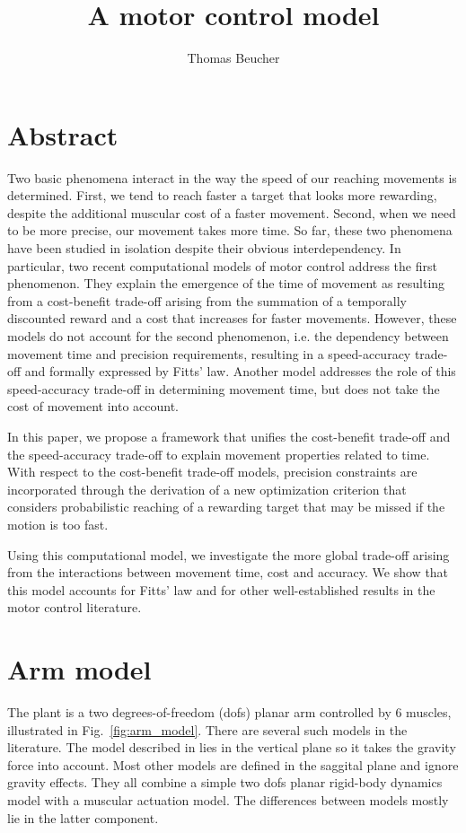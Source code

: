 \documentclass[pdftex,a4paper,11pt]{article}
\begin{document}
\title{A motor control model}
\author{Thomas Beucher}
\maketitle

\section*{Abstract}
Two basic phenomena interact in the way the speed of our reaching movements is determined.
First, we tend to reach faster a target that looks more rewarding, despite the additional muscular cost
of a faster movement.
Second, when we need to be more precise, our movement takes more time.
So far, these two phenomena have been studied in isolation despite their obvious interdependency.
In particular, two recent computational models of motor control address the first phenomenon. They explain the emergence of the time of movement as resulting from a cost-benefit trade-off arising from the summation of a temporally discounted reward and a cost that increases for faster movements.
However, these models do not account for the second phenomenon, i.e. the dependency between movement time and precision requirements, resulting in a speed-accuracy trade-off and formally expressed by Fitts' law. Another model addresses the role of this speed-accuracy trade-off in determining movement time, but does not take the cost of movement into account.

In this paper, we propose a framework that unifies the cost-benefit trade-off and the speed-accuracy trade-off to explain movement properties related to time.
With respect to the cost-benefit trade-off models, precision constraints are incorporated through the derivation of a new optimization criterion that considers probabilistic reaching of a rewarding target that may be missed if the motion is too fast.

Using this computational model, we investigate the more global trade-off arising from the interactions between movement time, cost and accuracy. We show that this model accounts for Fitts' law and for other well-established results in the motor control literature.


\section{Arm model}

The plant is a two degrees-of-freedom (dofs) planar arm controlled by 6 muscles, illustrated in Fig.~\ref{fig:arm_model}.
There are several such models in the literature. The model described in \cite{Kambara2009} lies in the vertical
plane so it takes the gravity force into account. Most other models are defined in the saggital plane and
ignore gravity effects. They all combine a simple two dofs planar rigid-body dynamics model with a 
muscular actuation model. The differences between models mostly lie in the latter component.
\end{document}
